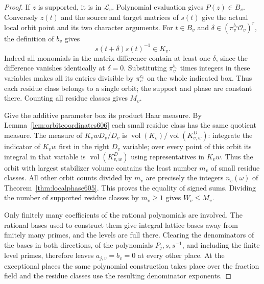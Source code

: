 \documentclass[a4paper,11pt]{article}
\theoremstyle{definition}
\theoremstyle{remark}
\numberwithin{equation}{section}
\begin{document}
\begin{proof}
If \(z\) is supported, it is in \(\mathcal L_v\). Polynomial
evaluation gives \(P(z)\in B_v\). Conversely \(z(t)\) and the
source and target matrices of \(s(t)\) give the actual local
orbit point and its two character arguments. For \(t\in B_v\)
and \(\delta\in(\pi_v^{b_v}\mathcal O_v)^r\), the definition
of \(b_v\) gives
\[
                        s(t+\delta)s(t)^{-1}\in K_v .
\]
Indeed all monomials in the matrix difference contain at
least one \(\delta\), since the difference vanishes identically
at \(\delta=0\). Substituting \(\pi_v^{b_v}\) times integers
in these variables makes all its entries divisible by
\(\pi_v^{c_v}\) on the whole indicated box. Thus each residue
class belongs to a single orbit; the support and phase are
constant there. Counting all residue classes gives \(M_v\).

Give the additive parameter box its product Haar measure.
By Lemma~\ref{lem:orbitcoordinates606} each small residue
class has the same quotient measure. The measure of
\(K_v wD_v/D_v\) is
\(\operatorname{vol}(K_v)/\operatorname{vol}(K^D_{v,w})\):
integrate the indicator of \(K_vw\) first in the right
\(D_v\) variable; over every point of this orbit its
integral in that variable is \(\operatorname{vol}(K^D_{v,w})\)
using representatives in \(K_vw\). Thus the orbit with
largest stabilizer volume contains the least number \(m_v\)
of small residue classes. All other orbit counts divided by
\(m_v\) are precisely the integers \(n_v(\omega)\) of
Theorem~\ref{thm:localphase605}. This proves the equality of
signed sums. Dividing the number of supported residue classes
by \(m_v\ge1\) gives \(W_v\le M_v\).

Only finitely many coefficients of the rational polynomials
are involved. The rational bases used to construct them give
integral lattice bases away from finitely many primes, and
the levels are full there. Clearing the denominators of the
bases in both directions, of the polynomials \(P_j,s,s^{-1}\),
and including the finite level primes, therefore leaves
\(a_{j,v}=b_v=0\) at every other place. At the exceptional
places the same polynomial construction takes place over
the fraction field and the residue classes use the resulting
denominator exponents.
\end{proof}
\end{document}
